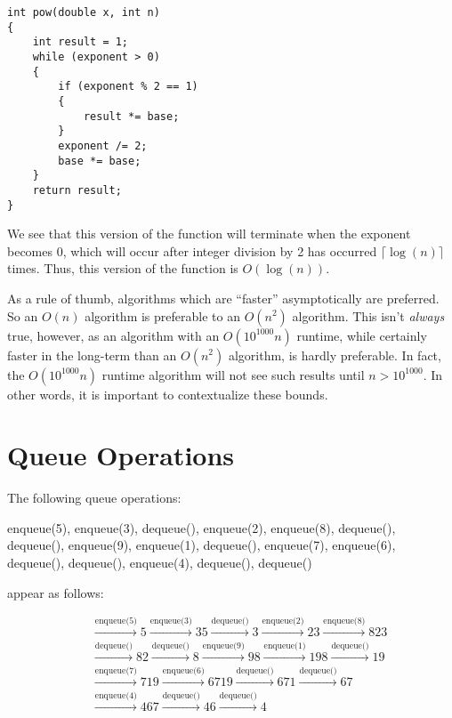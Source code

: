 \documentclass[a4paper]{article}
\begin{document}
\begin{itemize}
\begin{verbatim}
int pow(double x, int n)
{
	int result = 1;
	while (exponent > 0)
	{
		if (exponent % 2 == 1)
		{
			result *= base;
		}
		exponent /= 2;
		base *= base;
	}
	return result;
}
\end{verbatim}

We see that this version of the function will terminate when the exponent becomes 0, which will occur after integer division by 2 has occurred $\lceil\log(n)\rceil$ times. Thus, this version of the function is $O(\log(n))$.

As a rule of thumb, algorithms which are ``faster'' asymptotically are preferred. So an $O(n)$ algorithm is preferable to an $O(n^2)$ algorithm. This isn't \textit{always} true, however, as an algorithm with an $O(10^{1000}n)$ runtime, while certainly faster in the long-term than an $O(n^2)$ algorithm, is hardly preferable. In fact, the $O(10^{1000}n)$ runtime algorithm will not see such results until $n>10^{1000}$. In other words, it is important to contextualize these bounds.
\end{itemize}

\section{Queue Operations}
The following queue operations:

enqueue(5), enqueue(3), dequeue(), enqueue(2), enqueue(8), dequeue(), dequeue(), enqueue(9), enqueue(1), dequeue(), enqueue(7), enqueue(6), dequeue(), dequeue(), enqueue(4), dequeue(), dequeue()

appear as follows:

\begin{align*}
\boxed{\phantom{5}}&\xrightarrow{\text{enqueue(5)}}\boxed{5}\xrightarrow{\text{enqueue(3)}}\boxed{3}\boxed{5}\xrightarrow{\text{dequeue()}}\boxed{3}\xrightarrow{\text{enqueue(2)}}\boxed{2}\boxed{3}\xrightarrow{\text{enqueue(8)}}\boxed{8}\boxed{2}\boxed{3}\\&\xrightarrow{\text{dequeue()}}\boxed{8}\boxed{2}\xrightarrow{\text{dequeue()}}\boxed{8}\xrightarrow{\text{enqueue(9)}}\boxed{9}\boxed{8}\xrightarrow{\text{enqueue(1)}}\boxed{1}\boxed{9}\boxed{8}\xrightarrow{\text{dequeue()}}\boxed{1}\boxed{9}\\&\xrightarrow{\text{enqueue(7)}}\boxed{7}\boxed{1}\boxed{9}\xrightarrow{\text{enqueue(6)}}\boxed{6}\boxed{7}\boxed{1}\boxed{9}\xrightarrow{\text{dequeue()}}\boxed{6}\boxed{7}\boxed{1}\xrightarrow{\text{dequeue()}}\boxed{6}\boxed{7}\\&\xrightarrow{\text{enqueue(4)}}\boxed{4}\boxed{6}\boxed{7}\xrightarrow{\text{dequeue()}}\boxed{4}\boxed{6}\xrightarrow{\text{dequeue()}}\boxed{4}
\end{align*}
\end{document}
